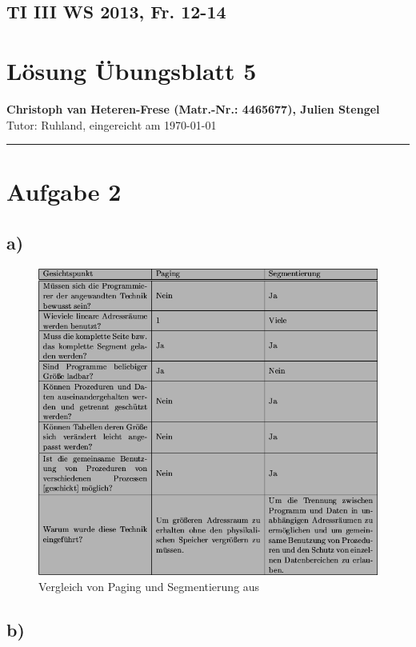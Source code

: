 \documentclass[11pt, a4paper]{scrartcl}
\begin{document}
\lstset{basicstyle=\small,
		 inputencoding=latin1,
		stringstyle=\ttfamily,
		identifierstyle=,
		showstringspaces=false,
		language=c,
		frame=trBL}
%
\subsection*{TI III WS 2013, Fr. 12-14}
\section*{Lösung Übungsblatt 5}
\textbf{Christoph van Heteren-Frese (Matr.-Nr.: 4465677), Julien  Stengel } \\%
Tutor: Ruhland, eingereicht am \today\\
\hrule
%
\section*{Aufgabe 2}
\subsection*{a)}
\begin{figure}[H]
\center
\includegraphics[scale=0.55]{img18}
\caption{Vergleich von Paging und Segmentierung aus \citep{tanenbaum_moderne_1994}}
\end{figure}
\subsection*{b)}
\end{document}
